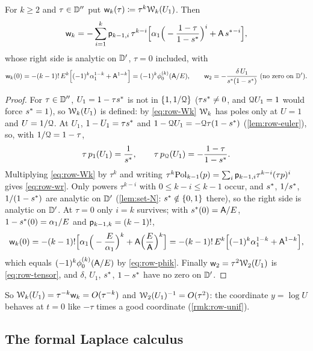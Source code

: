 \begin{lem}
\label{lem:row-wr}
For $k\geq2$ and $\tau\in\mathbb{D}''$ put $\mathsf{w}_k(\tau)\coloneqq\tau^k\mathcal{W}_k(U_1)$. Then
\begin{equation}
\label{eq:row-wr}
\mathsf{w}_k=-\sum_{i=1}^{k}\mathsf{p}_{k-1,i}\,\tau^{k-i}\Big[\alpha_1\Big(-\frac{1-\tau}{1-s^{\ast}}\Big)^{i}+\mathsf{A}\,s^{\ast}{}^{-i}\Big],
\end{equation}
whose right side is analytic on $\mathbb{D}'$, $\tau=0$ included, with
\[
\mathsf{w}_k(0)=-(k-1)!\,E^k\Big[(-1)^k\alpha_1^{1-k}+\mathsf{A}^{1-k}\Big]=(-1)^k\phi_0^{(k)}(\mathsf{A}/E),\qquad
\mathsf{w}_2=-\frac{\delta\,U_1}{s^{\ast}(1-s^{\ast})}\ \text{(no zero on $\mathbb{D}'$)}.
\]
\end{lem}

\begin{proof}
For $\tau\in\mathbb{D}''$, $U_1=1-\tau s^{\ast}$ is not in $\{1,1/\mathcal{Q}\}$ ($\tau s^{\ast}\neq0$, and $\mathcal{Q} U_1=1$ would force $s^{\ast}=1$), so $\mathcal{W}_k(U_1)$ is defined: by \eqref{eq:row-Wk} $\mathcal{W}_k$ has poles only at $U=1$ and $U=1/\mathcal{Q}$. At $U_1$, $1-U_1=\tau s^{\ast}$ and $1-\mathcal{Q} U_1=-\mathcal{Q}\tau(1-s^{\ast})$ (\cref{lem:row-euler}), so, with $1/\mathcal{Q}=1-\tau$,
\[
\tau\,p_1(U_1)=\frac{1}{s^{\ast}},\qquad \tau\,p_{\mathcal{Q}}(U_1)=-\frac{1-\tau}{1-s^{\ast}}.
\]
Multiplying \eqref{eq:row-Wk} by $\tau^k$ and writing $\tau^k\mathrm{Pol}_{k-1}(p)=\sum_i\mathsf{p}_{k-1,i}\tau^{k-i}(\tau p)^i$ gives \eqref{eq:row-wr}. Only powers $\tau^{k-i}$ with $0\leq k-i\leq k-1$ occur, and $s^{\ast}$, $1/s^{\ast}$, $1/(1-s^{\ast})$ are analytic on $\mathbb{D}'$ (\cref{lem:set-N}: $s^{\ast}\notin\{0,1\}$ there), so the right side is analytic on $\mathbb{D}'$. At $\tau=0$ only $i=k$ survives; with $s^{\ast}(0)=\mathsf{A}/E$, $1-s^{\ast}(0)=\alpha_1/E$ and $\mathsf{p}_{k-1,k}=(k-1)!$,
\[
\mathsf{w}_k(0)=-(k-1)!\Big[\alpha_1\Big(-\frac{E}{\alpha_1}\Big)^k+\mathsf{A}\Big(\frac{E}{\mathsf{A}}\Big)^k\Big]=-(k-1)!\,E^k\Big[(-1)^k\alpha_1^{1-k}+\mathsf{A}^{1-k}\Big],
\]
which equals $(-1)^k\phi_0^{(k)}(\mathsf{A}/E)$ by \eqref{eq:row-phik}. Finally $\mathsf{w}_2=\tau^2\mathcal{W}_2(U_1)$ is \eqref{eq:row-tensor}, and $\delta$, $U_1$, $s^{\ast}$, $1-s^{\ast}$ have no zero on $\mathbb{D}'$.
\end{proof}

So $\mathcal{W}_k(U_1)=\tau^{-k}\mathsf{w}_k=O(\tau^{-k})$ and $\mathcal{W}_2(U_1)^{-1}=O(\tau^2)$: the coordinate $y=\log U$ behaves at $t=0$ like $-\tau$ times a good coordinate (\cref{rmk:row-unif}).

\subsection{The formal Laplace calculus}
\label{sec:row-laplace}

